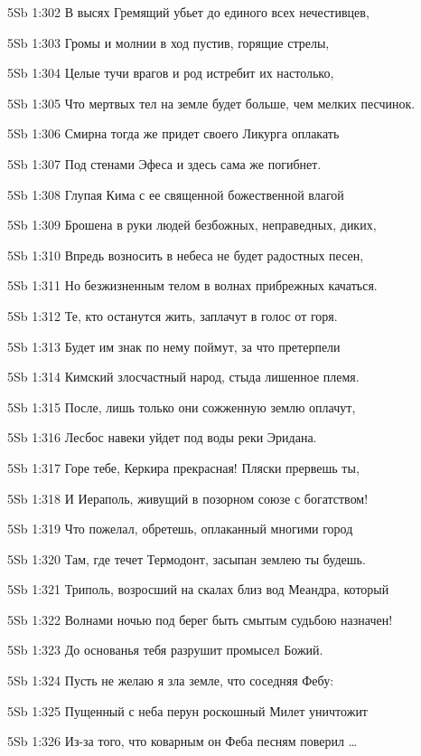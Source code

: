 \vs 5Sb 1:302 В высях Гремящий убьет до единого всех нечестивцев, 

\vs 5Sb 1:303 Громы и молнии в ход пустив, горящие стрелы, 

\vs 5Sb 1:304 Целые тучи врагов  и род истребит их настолько,

\vs 5Sb 1:305 Что мертвых тел на земле будет больше, чем мелких песчинок.

\vs 5Sb 1:306 Смирна тогда же придет своего Ликурга оплакать 

\vs 5Sb 1:307 Под стенами Эфеса и здесь сама же погибнет.

\vs 5Sb 1:308 Глупая Кима с ее священной божественной влагой

\vs 5Sb 1:309 Брошена в руки людей безбожных, неправедных, диких, 

\vs 5Sb 1:310 Впредь возносить в небеса не будет радостных песен,

\vs 5Sb 1:311 Но безжизненным телом в волнах прибрежных качаться.

\vs 5Sb 1:312 Те, кто останутся жить, заплачут в голос от горя.

\vs 5Sb 1:313 Будет им знак  по нему поймут, за что претерпели 

\vs 5Sb 1:314 Кимский злосчастный народ, стыда лишенное племя. 

\vs 5Sb 1:315 После, лишь только они сожженную землю оплачут,

\vs 5Sb 1:316 Лесбос навеки уйдет под воды реки Эридана.

\vs 5Sb 1:317 Горе тебе, Керкира прекрасная! Пляски прервешь ты, 

\vs 5Sb 1:318 И Иераполь, живущий в позорном союзе с богатством! 

\vs 5Sb 1:319 Что пожелал, обретешь, оплаканный многими город  

\vs 5Sb 1:320 Там, где течет Термодонт, засыпан землею ты будешь. 

\vs 5Sb 1:321 Триполь, возросший на скалах близ вод Меандра, который 

\vs 5Sb 1:322 Волнами ночью под берег быть смытым судьбою назначен! 

\vs 5Sb 1:323 До основанья тебя разрушит промысел Божий.

\vs 5Sb 1:324 Пусть не желаю я зла земле, что соседняя Фебу: 

\vs 5Sb 1:325 Пущенный с неба перун роскошный Милет уничтожит 

\vs 5Sb 1:326 Из-за того, что коварным он Феба песням поверил \ldots

